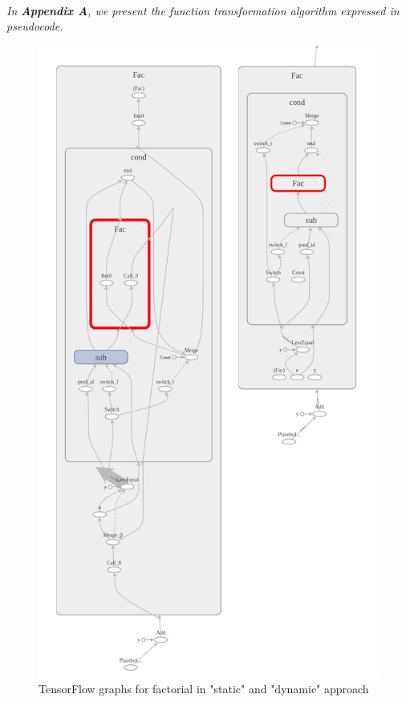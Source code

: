 \documentclass[ack,preface]{dithesis}
\begin{document}
\  \\
\textit{In \textbf{Appendix A}, we present the function transformation algorithm expressed in pseudocode.}

\begin{figure}
\centering
\includegraphics[scale=0.42]{figures/tf_factorial}
\caption{TensorFlow graphs for factorial in "static" and "dynamic" approach}
\end{figure}
\end{document}
